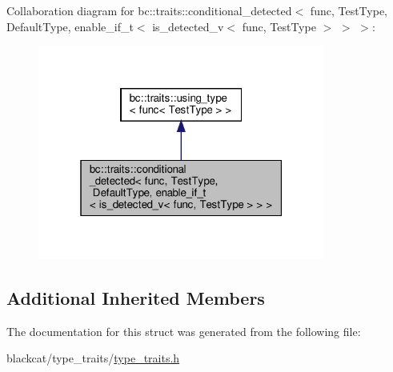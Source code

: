 Collaboration diagram for bc\+:\+:traits\+:\+:conditional\+\_\+detected$<$ func, Test\+Type, Default\+Type, enable\+\_\+if\+\_\+t$<$ is\+\_\+detected\+\_\+v$<$ func, Test\+Type $>$ $>$ $>$\+:\nopagebreak
\begin{figure}[H]
\begin{center}
\leavevmode
\includegraphics[width=268pt]{structbc_1_1traits_1_1conditional__detected_3_01func_00_01TestType_00_01DefaultType_00_01enable_e3630b19b40b4da06d9d16f3dbb498e9}
\end{center}
\end{figure}
\subsection*{Additional Inherited Members}


The documentation for this struct was generated from the following file\+:\begin{DoxyCompactItemize}
\item 
blackcat/type\+\_\+traits/\hyperlink{type__traits_2type__traits_8h}{type\+\_\+traits.\+h}\end{DoxyCompactItemize}
